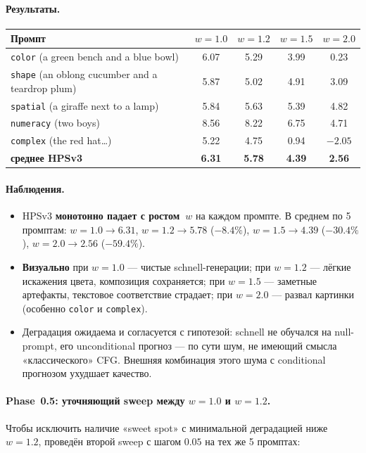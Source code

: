 \documentclass[11pt,a4paper]{article}
\begin{document}
\paragraph{Результаты.}
\begin{center}
\begin{tabular}{lcccc}
\toprule
Промпт & $w=1.0$ & $w=1.2$ & $w=1.5$ & $w=2.0$ \\
\midrule
\texttt{color} (a green bench and a blue bowl) & 6.07 & 5.29 & 3.99 & 0.23 \\
\texttt{shape} (an oblong cucumber and a teardrop plum) & 5.87 & 5.02 & 4.91 & 3.09 \\
\texttt{spatial} (a giraffe next to a lamp) & 5.84 & 5.63 & 5.39 & 4.82 \\
\texttt{numeracy} (two boys) & 8.56 & 8.22 & 6.75 & 4.71 \\
\texttt{complex} (the red hat\ldots) & 5.22 & 4.75 & 0.94 & $-2.05$ \\
\midrule
\textbf{среднее HPSv3} & \textbf{6.31} & \textbf{5.78} & \textbf{4.39} & \textbf{2.56} \\
\bottomrule
\end{tabular}
\end{center}

\paragraph{Наблюдения.}
\begin{itemize}[leftmargin=2em,itemsep=2pt]
  \item HPSv3 \textbf{монотонно падает с ростом~$w$} на каждом промпте.
        В среднем по 5 промптам: $w=1.0 \to 6.31$, $w=1.2 \to 5.78$
        ($-8.4\%$), $w=1.5 \to 4.39$ ($-30.4\%$), $w=2.0 \to 2.56$
        ($-59.4\%$).
  \item \textbf{Визуально} при $w=1.0$ --- чистые schnell-генерации;
        при $w=1.2$ --- лёгкие искажения цвета, композиция сохраняется;
        при $w=1.5$ --- заметные артефакты, текстовое соответствие
        страдает; при $w=2.0$ --- развал картинки (особенно \texttt{color}
        и \texttt{complex}).
  \item Деградация ожидаема и согласуется с гипотезой: schnell не
        обучался на null-prompt, его unconditional прогноз --- по сути
        шум, не имеющий смысла «классического» CFG. Внешняя комбинация
        этого шума с conditional прогнозом ухудшает качество.
\end{itemize}

\paragraph{Phase~0.5: уточняющий sweep между $w=1.0$ и $w=1.2$.}
Чтобы исключить наличие «sweet spot» с минимальной деградацией ниже
$w=1.2$, проведён второй sweep с шагом $0.05$ на тех же 5 промптах:
\end{document}
